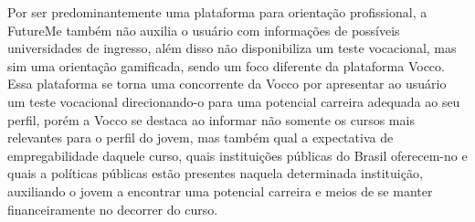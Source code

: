 Por ser predominantemente uma plataforma para orientação profissional, a FutureMe também não auxilia o usuário com informações de possíveis universidades de ingresso, além disso  não disponibiliza um teste vocacional, mas sim uma orientação gamificada, sendo um foco diferente da plataforma Vocco. Essa plataforma se torna uma concorrente da Vocco por apresentar ao usuário um teste vocacional direcionando-o para uma potencial carreira adequada ao seu perfil, porém a Vocco se destaca ao informar não somente os cursos mais relevantes para o perfil do jovem, mas também qual a expectativa de empregabilidade daquele curso, quais instituições públicas do Brasil oferecem-no e quais a políticas públicas estão presentes naquela determinada instituição, auxiliando o jovem a encontrar uma potencial carreira e meios de se manter financeiramente no decorrer do curso.







